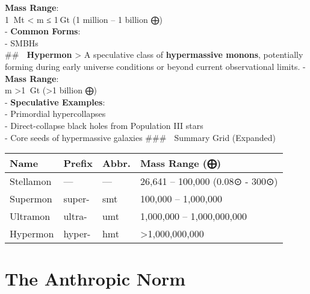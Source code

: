 \documentclass[
  letterpaper,
]{book}
\begin{document}
\textbf{Mass Range}:\\
1  Mt \textless{} m ≤ 1 Gt (1 million -- 1 billion ⨁)\\
- \textbf{Common Forms}:\\
- SMBHs\\
\#\# 🔴 \textbf{Hypermon} \textgreater{} A speculative class of
\textbf{hypermassive monons}, potentially forming during early universe
conditions or beyond current observational limits. - \textbf{Mass
Range}:\\
m \textgreater1  Gt (\textgreater1 billion ⨁)\\
- \textbf{Speculative Examples}:\\
- Primordial hypercollapses\\
- Direct-collapse black holes from Population III stars\\
- Core seeds of hypermassive galaxies \#\#\# 🧭 Summary Grid (Expanded)

\begin{longtable}[]{@{}llll@{}}
\toprule\noalign{}
Name & Prefix & Abbr. & Mass Range (⨁) \\
\midrule\noalign{}
\endhead
\bottomrule\noalign{}
\endlastfoot
Stellamon & --- & --- & 26,641 -- 100,000 (0.08⊙ - 300⊙) \\
Supermon & super- & smt & 100,000 -- 1,000,000 \\
Ultramon & ultra- & umt & 1,000,000 -- 1,000,000,000 \\
Hypermon & hyper- & hmt & \textgreater1,000,000,000 \\
\end{longtable}

\chapter{The Anthropic Norm}\label{the-anthropic-norm}
\end{document}
